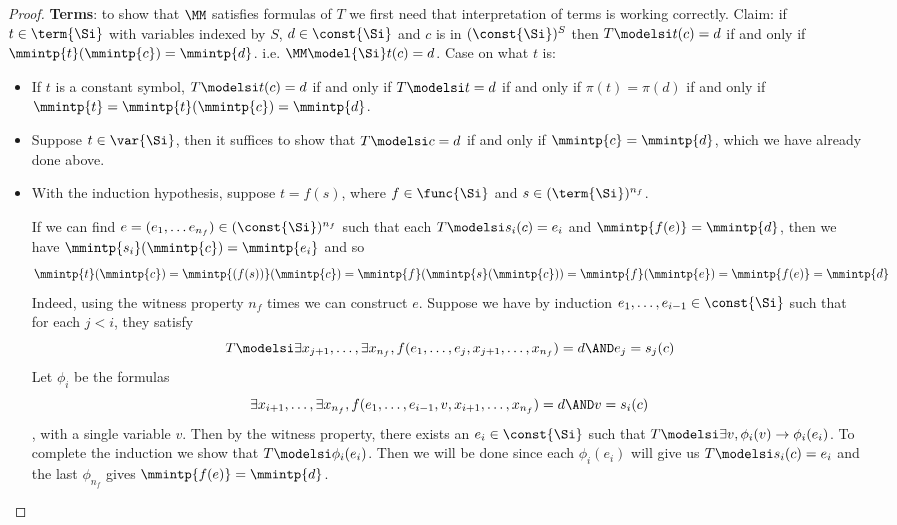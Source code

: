 \begin{proof}
    \textbf{Terms}: to show that $\MM$ satisfies formulas of $T$ 
    we first need that interpretation of terms is working correctly. 
    Claim: if $t \in \term{\Si}$ with variables indexed by $S$,
    $d \in \const{\Si}$ and
    $c$ is in $(\const{\Si})^S$
    then $T \modelsi t(c) = d$ 
    if and only if $\mmintp{t}(\mmintp{c}) = \mmintp{d}$.
    i.e. $\MM \model{\Si} t(c) = d$.
    Case on what $t$ is:
    \begin{itemize}
        \item If $t$ is a constant symbol,
        $T \modelsi t(c) = d$ if and only if 
        $T \modelsi t = d$ 
        if and only if $\pi(t) = \pi(d)$
        if and only if $\mmintp{t} = \mmintp{t}(\mmintp{c}) = \mmintp{d}$.
        \item Suppose $t \in \var{\Si}$,
        then it suffices to show that $T \modelsi c = d$ 
        if and only if $\mmintp{c} = \mmintp{d}$, 
        which we have already done above.
        \item With the induction hypothesis, 
        suppose $t = f(s)$, 
        where $f \in \func{\Si}$ and $s \in (\term{\Si})^{n_f}$.
        \begin{forward} 
            If we can find 
            $e = (e_1, \dots e_{n_f}) \in (\const{\Si})^{n_f}$ 
            such that each 
            $T \modelsi s_i (c) = e_i$
            and $\mmintp{f(e)} = \mmintp{d}$,
            then we have 
            $\mmintp{s_i}(\mmintp{c})
            = \mmintp{e_i}$ and so
            \[
                \mmintp{t}(\mmintp{c}) = \mmintp{(f(s))}(\mmintp{c})
                = \mmintp{f}(\mmintp{s}(\mmintp{c}))
                = \mmintp{f}(\mmintp{e})
                = \mmintp{f(e)} = \mmintp{d}
            \]
            Indeed, using the witness property $n_f$
            times we can construct $e$.
            Suppose we have by induction
            $e_1,\dots, e_{i-1} \in \const{\Si}$
            such that for each $j<i$, 
            they satisfy
            \[
                T \modelsi \exists x_{j+1}, \dots, \exists x_{n_f}, 
                f(e_1, \dots, e_j, x_{j+1},\dots, x_{n_f}) = d 
                \AND e_j = s_j (c)
            \]
            Let $\phi_i$ be the formulas 
            \[
                \exists x_{i+1}, \dots, \exists x_{n_f}, 
                f(e_1, \dots, e_{i-1},v,x_{i+1},\dots, x_{n_f}) = d 
                \AND v = s_i (c)
            \], 
            with a single variable $v$.
            Then by the witness property,
            there exists an $e_i \in \const{\Si}$ such that
            $T \modelsi \exists v, \phi_i(v) \to \phi_i(e_i)$.
            To complete the induction we show that $T \modelsi \phi_i(e_i)$.
            Then we will be done since each $\phi_i(e_i)$ 
            will give us $T \modelsi s_i (c) = e_i$
            and the last $\phi_{n_f}$ gives $\mmintp{f(e)} = \mmintp{d}$.


\end{forward}
\end{itemize}
\end{proof}
